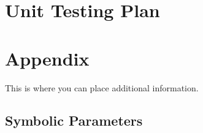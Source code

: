 \documentclass[12pt, titlepage]{article}
\begin{document}
{%



					
					
					
					
					

					
					
					
					



				
\section{Unit Testing Plan}
		





\newpage

\section{Appendix}

This is where you can place additional information.

\subsection{Symbolic Parameters}

}
\end{document}
